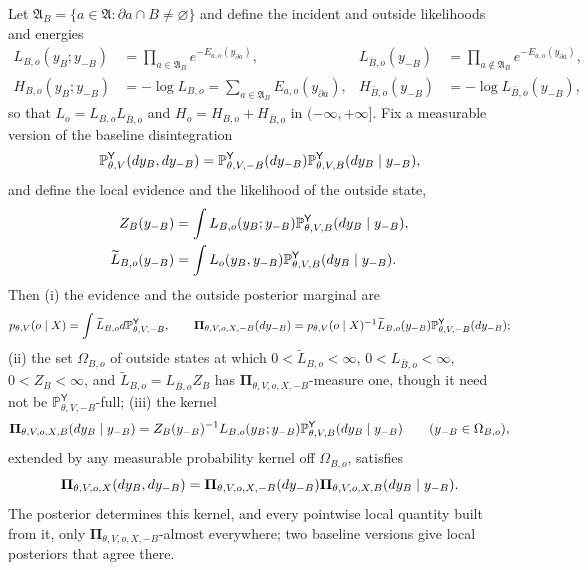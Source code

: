 Let $\mathfrak A_B=\{a\in\mathfrak A:\partial a\cap B\ne\varnothing\}$ and define
the incident and outside likelihoods and energies
\begin{align}
L_{B,o}(y_B;y_{-B})&=\prod_{a\in\mathfrak A_B}e^{-E_{a,o}(y_{\partial a})},
&L_{\bar B,o}(y_{-B})&=\prod_{a\notin\mathfrak A_B}e^{-E_{a,o}(y_{\partial a})},
\label{eq:obs-block-incident-likelihood}\\
H_{B,o}(y_B;y_{-B})&=-\log L_{B,o}=\sum_{a\in\mathfrak A_B}E_{a,o}(y_{\partial a}),
&H_{\bar B,o}(y_{-B})&=-\log L_{\bar B,o}(y_{-B}),
\label{eq:obs-block-incident-energy}
\end{align}
so that $L_o=L_{B,o}L_{\bar B,o}$ and $H_o=H_{B,o}+H_{\bar B,o}$ in
$(-\infty,+\infty]$. Fix a measurable version of the baseline disintegration
\begin{equation}
\mathbb P^{\mathsf Y}_{\theta,V}(dy_B,dy_{-B})
=\mathbb P^{\mathsf Y}_{\theta,V,-B}(dy_{-B})\mathbb P^{\mathsf Y}_{\theta,V,B}(dy_B\mid y_{-B}),
\label{eq:obs-baseline-block-disintegration}
\end{equation}
and define the local evidence and the likelihood of the outside state,
\begin{align}
Z_B(y_{-B})&=\int L_{B,o}(y_B;y_{-B})\mathbb P^{\mathsf Y}_{\theta,V,B}(dy_B\mid y_{-B}),
\label{eq:obs-local-evidence}\\
\widetilde L_{B,o}(y_{-B})&=\int L_o(y_B,y_{-B})\mathbb P^{\mathsf Y}_{\theta,V,B}(dy_B\mid y_{-B}).
\label{eq:obs-full-complement-likelihood}
\end{align}
Then (i) the evidence and the outside posterior marginal are
\begin{equation}
p_{\theta,V}(o\mid X)=\int\widetilde L_{B,o}d\mathbb P^{\mathsf Y}_{\theta,V,-B},
\qquad
\boldsymbol\Pi_{\theta,V,o,X,-B}(dy_{-B})
=p_{\theta,V}(o\mid X)^{-1}\widetilde L_{B,o}(y_{-B})\mathbb P^{\mathsf Y}_{\theta,V,-B}(dy_{-B});
\label{eq:obs-posterior-outside}
\end{equation}
(ii) the set $\Omega_{B,o}$ of outside states at which
$0<\widetilde L_{B,o}<\infty$, $0<L_{\bar B,o}<\infty$, $0<Z_B<\infty$, and
$\widetilde L_{B,o}=L_{\bar B,o}Z_B$ has $\boldsymbol\Pi_{\theta,V,o,X,-B}$-measure
one, though it need not be $\mathbb P^{\mathsf Y}_{\theta,V,-B}$-full; (iii) the
kernel
\begin{equation}
\boldsymbol\Pi_{\theta,V,o,X,B}(dy_B\mid y_{-B})
=Z_B(y_{-B})^{-1}L_{B,o}(y_B;y_{-B})\mathbb P^{\mathsf Y}_{\theta,V,B}(dy_B\mid y_{-B})
\qquad(y_{-B}\in\Omega_{B,o}),
\label{eq:obs-local-posterior}
\end{equation}
extended by any measurable probability kernel off $\Omega_{B,o}$, satisfies
\begin{equation}
\boldsymbol\Pi_{\theta,V,o,X}(dy_B,dy_{-B})
=\boldsymbol\Pi_{\theta,V,o,X,-B}(dy_{-B})\boldsymbol\Pi_{\theta,V,o,X,B}(dy_B\mid y_{-B}).
\label{eq:obs-posterior-block-disintegration}
\end{equation}
The posterior determines this kernel, and every pointwise local quantity built
from it, only $\boldsymbol\Pi_{\theta,V,o,X,-B}$-almost everywhere; two baseline
versions give local posteriors that agree there. 

